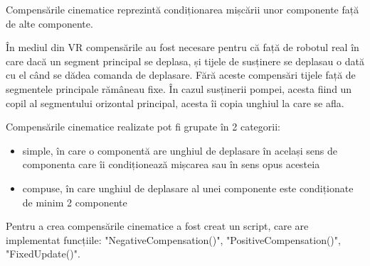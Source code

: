 Compensările cinematice reprezintă condiționarea mișcării unor componente față de alte componente. 

În mediul din VR compensările au fost necesare pentru că față de robotul real în care dacă un segment principal se deplasa,  și tijele de susținere se deplasau o dată cu el când se dădea comanda de deplasare. Fără aceste compensări tijele față de segmentele principale rămâneau fixe. În cazul susținerii pompei, acesta fiind un copil al segmentului orizontal principal, acesta îi copia unghiul la care se afla.


Compensările cinematice realizate pot fi grupate în 2 categorii:
\begin{itemize}
	\item simple, în care o componentă are unghiul de deplasare în același sens de componenta care îi condiționează mișcarea sau în sens opus acesteia
	\item compuse, în care unghiul de deplasare al unei componente este condiționate de minim 2 componente
\end{itemize}

Pentru a crea compensările cinematice a fost creat un script, care are implementat funcțiile: "NegativeCompensation()", "PositiveCompensation()", "FixedUpdate()".


